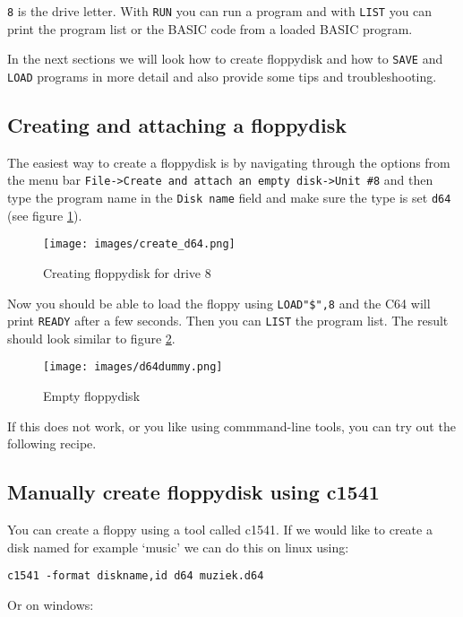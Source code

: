 \verb:8: is the drive letter.
With \verb:RUN: you can run a program and with \verb:LIST: you can print the program list or the BASIC code from a loaded BASIC program.

In the next sections we will look how to create floppydisk and how to \verb:SAVE: and \verb:LOAD: programs in more detail and also provide some tips and troubleshooting.

\subsection{Creating and attaching a floppydisk}

The easiest way to create a floppydisk is by navigating through the options from the menu bar \verb:File->Create and attach an empty disk->Unit #8: and
then type the program name in the \verb:Disk name: field and make sure the type is set \verb:d64: (see figure \ref{fig:create_d64}).

\begin{figure}
\centering
\texttt{[image: images/create\_d64.png]}
\caption{Creating floppydisk for drive 8}
\label{fig:create_d64}
\end{figure}

Now you should be able to load the floppy using \verb:LOAD"$",8: and the C64 will print \verb:READY: after a few seconds.
Then you can \verb:LIST: the program list.
The result should look similar to figure \ref{fig:d64dummy}.

\begin{figure}
\centering
\texttt{[image: images/d64dummy.png]}
\caption{Empty floppydisk}
\label{fig:d64dummy}
\end{figure}

If this does not work, or you like using commmand-line tools, you can try out the following recipe.

\subsection{Manually create floppydisk using c1541}

You can create a floppy using a tool called c1541.
If we would like to create a disk named for example `music' we can do this on linux using:

\begin{lstlisting}
c1541 -format diskname,id d64 muziek.d64
\end{lstlisting}

Or on windows:

